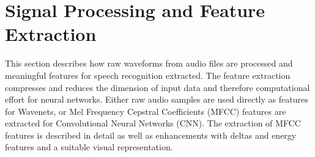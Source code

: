 
\chapter{Signal Processing and Feature Extraction}\label{sec:signal}
This section describes how raw waveforms from audio files are processed and meaningful features for speech recognition extracted.
The feature extraction compresses and reduces the dimension of input data and therefore computational effort for neural networks.
Either raw audio samples are used directly as features for Wavenets, or Mel Frequency Cepstral Coefficients (MFCC) features are extracted for Convolutional Neural Networks (CNN).
The extraction of MFCC features is described in detail as well as enhancements with deltas and energy features and a suitable visual representation.





